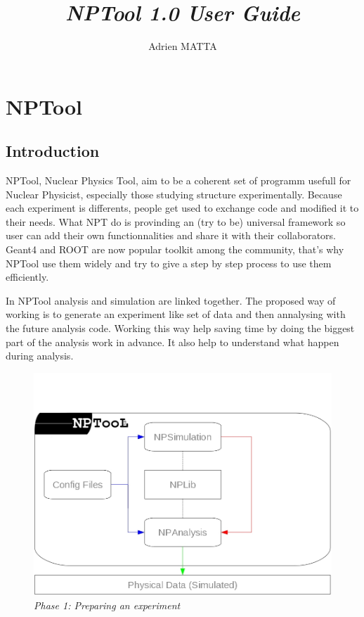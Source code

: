 \documentclass{book}
\begin{document}
\title{\emph{NPTool 1.0 User Guide}}
\author{Adrien MATTA}

\maketitle 
\pagebreak
\tableofcontents %
\pagebreak

\chapter[NPTool]{NPTool}
\section {Introduction}

NPTool, Nuclear Physics Tool, aim to be a coherent set of programm usefull for Nuclear Physicist, especially those studying structure experimentally. Because each experiment is differents, people get used to exchange code and modified it to their needs. What NPT do is provinding an (try to be) universal framework so user can add their own functionnalities and share it with their collaborators. Geant4 and ROOT are now popular toolkit among the community, that's why NPTool use them widely and try to give a step by step process to use them efficiently.

In NPTool analysis and simulation are linked together. The proposed way of working is to generate an experiment like set of data and then annalysing with the future analysis code. Working this way help saving time by doing the biggest part of the analysis work in advance. It also help to understand what happen during analysis. 

				\begin{figure}[!htbp]
					\centering
					\includegraphics[width=1\textwidth]{./pictures/nptool_scheme_Sim.png}
					\caption{ \emph{Phase 1: Preparing an experiment} }
				\end{figure}
\end{document}
